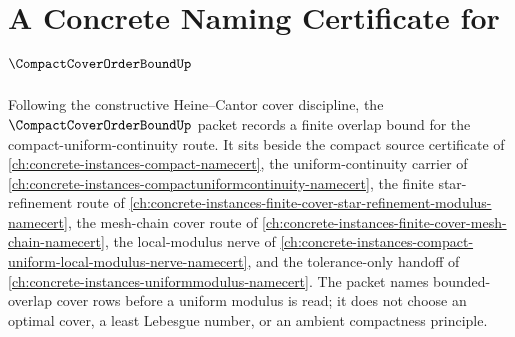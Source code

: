 \chapter{A Concrete Naming Certificate for $\CompactCoverOrderBoundUp$}
\label{ch:concrete-instances-compact-cover-order-bound-namecert}

Following the constructive Heine--Cantor cover discipline, the $\CompactCoverOrderBoundUp$ packet records a finite overlap bound for the compact-uniform-continuity route. It sits beside the compact source certificate of \autoref{ch:concrete-instances-compact-namecert}, the uniform-continuity carrier of \autoref{ch:concrete-instances-compactuniformcontinuity-namecert}, the finite star-refinement route of \autoref{ch:concrete-instances-finite-cover-star-refinement-modulus-namecert}, the mesh-chain cover route of \autoref{ch:concrete-instances-finite-cover-mesh-chain-namecert}, the local-modulus nerve of \autoref{ch:concrete-instances-compact-uniform-local-modulus-nerve-namecert}, and the tolerance-only handoff of \autoref{ch:concrete-instances-uniformmodulus-namecert}. The packet names bounded-overlap cover rows before a uniform modulus is read; it does not choose an optimal cover, a least Lebesgue number, or an ambient compactness principle.

